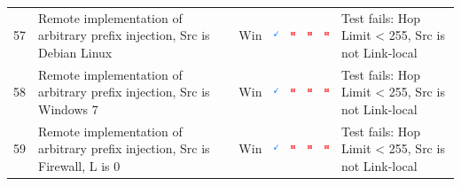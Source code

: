 \documentclass[12pt]{article}
\begin{document}
\begin{savenotes}
\begin{table}[!h]
{{\begin{tabular}{|C{1.0cm}|L{6.0cm}|C{1.5cm}|C{1.0cm}|C{1.0cm}|C{1.0cm}|C{1.0cm}|L{7.0cm}|}
57&Remote implementation of arbitrary prefix injection, Src is Debian Linux&Win&\includegraphics[width=4mm, height=4mm]{ok}&\includegraphics[width=4mm, height=4mm]{notok}&\includegraphics[width=4mm, height=4mm]{notok}&\includegraphics[width=4mm, height=4mm]{notok}&Test fails: Hop Limit < 255, Src is not Link-local\\
58&Remote implementation of arbitrary prefix injection, Src is Windows 7&Win&\includegraphics[width=4mm, height=4mm]{ok}&\includegraphics[width=4mm, height=4mm]{notok}&\includegraphics[width=4mm, height=4mm]{notok}&\includegraphics[width=4mm, height=4mm]{notok}&Test fails: Hop Limit < 255, Src is not Link-local\\
59&Remote implementation of arbitrary prefix injection, Src is Firewall, L is 0&Win&\includegraphics[width=4mm, height=4mm]{ok}&\includegraphics[width=4mm, height=4mm]{notok}&\includegraphics[width=4mm, height=4mm]{notok}&\includegraphics[width=4mm, height=4mm]{notok}&Test fails: Hop Limit < 255, Src is not Link-local\\

\end{tabular}}}
\end{table}
\end{savenotes}
\end{document}
